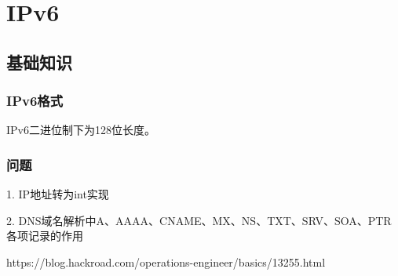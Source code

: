\chapter{IPv6}

\section{基础知识}
\label{chap:ipv6_base}

\subsection{IPv6格式}

IPv6二进位制下为128位长度。




\subsection{问题}

 1. IP地址转为int实现


2. DNS域名解析中A、AAAA、CNAME、MX、NS、TXT、SRV、SOA、PTR各项记录的作用

https://blog.hackroad.com/operations-engineer/basics/13255.html